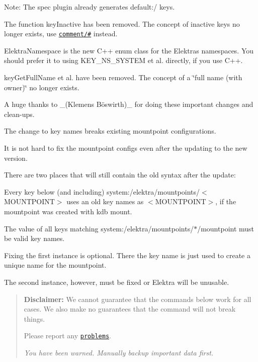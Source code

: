 \begin{DoxyItemize}
Note\+: The {\ttfamily spec} plugin already generates {\ttfamily default\+:/} keys.
\item The function {\ttfamily key\+Inactive} has been removed. The concept of inactive keys no longer exists, use \href{/home/jenkins/workspace/libelektra-release/doc/METADATA.ini}{\tt comment/\#} instead.
\item {\ttfamily Elektra\+Namespace} is the new C++ {\ttfamily enum class} for the Elektra\textquotesingle{}s namespaces. You should prefer it to using {\ttfamily K\+E\+Y\+\_\+\+N\+S\+\_\+\+S\+Y\+S\+T\+EM} et al. directly, if you use C++.
\item {\ttfamily key\+Get\+Full\+Name} et al. have been removed. The concept of a \char`\"{}full name (with owner)\char`\"{} no longer exists.
\end{DoxyItemize}

A huge thanks to \+\_\+(Klemens Böswirth)\+\_\+ for doing these important changes and clean-\/ups.

The change to key names breaks existing mountpoint configurations.

It is not hard to fix the mountpoint configs even after the updating to the new version.

There are two places that will still contain the old syntax after the update\+:


\begin{DoxyEnumerate}
\item Every key below (and including) {\ttfamily system\+:/elektra/mountpoints/$<$M\+O\+U\+N\+T\+P\+O\+I\+NT$>$} uses an old key names as {\ttfamily $<$M\+O\+U\+N\+T\+P\+O\+I\+NT$>$}, if the mountpoint was created with {\ttfamily kdb mount}.
\item The value of all keys matching {\ttfamily system\+:/elektra/mountpoints/$\ast$/mountpoint} must be valid key names.
\end{DoxyEnumerate}

Fixing the first instance is optional. There the key name is just used to create a unique name for the mountpoint.

The second instance, however, must be fixed or Elektra will be unusable.

\begin{quote}
{\bfseries Disclaimer\+:} We cannot guarantee that the commands below work for all cases. We also make no guarantees that the command will not break things.

Please report any \href{https://issues.libelektra.org/3633}{\tt problems}.

{\itshape You have been warned. Manually backup important data first.} \end{quote}


